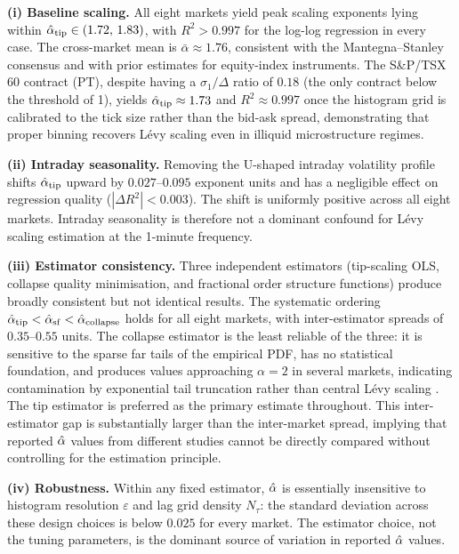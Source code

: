 \documentclass[12pt,a4paper]{article}
\begin{document}
\begin{table}[htbp]
\textbf{(i) Baseline scaling.}
All eight markets yield peak scaling exponents lying within
$\hat{\alpha}_{\mathrm{tip}}\in(1.72,\,1.83)$, with $R^2>0.997$ for the log-log
regression in every case.
The cross-market mean is $\bar\alpha\approx 1.76$, consistent with the
Mantegna--Stanley consensus and with prior estimates for equity-index
instruments.
The S\&P/TSX 60 contract (PT), despite having a $\sigma_1/\Delta$ ratio of
$0.18$ (the only contract below the threshold of 1), yields
$\hat{\alpha}_{\mathrm{tip}}\approx 1.73$ and $R^2\approx 0.997$ once the
histogram grid is calibrated to the tick size rather than the bid-ask spread,
demonstrating that proper binning recovers Lévy scaling even in illiquid
microstructure regimes.

\textbf{(ii) Intraday seasonality.}
Removing the U-shaped intraday volatility profile shifts $\hat{\alpha}_{\mathrm{tip}}$
upward by $0.027$--$0.095$ exponent units and has a negligible effect on
regression quality ($|\Delta R^2|<0.003$).
The shift is uniformly positive across all eight markets.
Intraday seasonality is therefore not a dominant confound for Lévy scaling
estimation at the 1-minute frequency.

\textbf{(iii) Estimator consistency.}
Three independent estimators (tip-scaling OLS, collapse quality minimisation,
and fractional order structure functions) produce broadly consistent but
not identical results.
The systematic ordering $\hat{\alpha}_{\mathrm{tip}}<\hat{\alpha}_{\mathrm{sf}}<
\hat{\alpha}_{\mathrm{collapse}}$ holds for all eight markets, with
inter-estimator spreads of $0.35$--$0.55$ units.
The collapse estimator is the least reliable of the three: it is sensitive
to the sparse far tails of the empirical PDF, has no statistical foundation,
and produces values approaching $\alpha=2$ in several markets, indicating
contamination by exponential tail truncation rather than central Lévy scaling
\cite{Weron2001}.
The tip estimator is preferred as the primary estimate throughout.
This inter-estimator gap is substantially larger than the inter-market
spread, implying that reported $\hat{\alpha}$ values from different studies cannot
be directly compared without controlling for the estimation principle.

\textbf{(iv) Robustness.}
Within any fixed estimator, $\hat{\alpha}$ is essentially insensitive to histogram
resolution $\varepsilon$ and lag grid density $N_\tau$: the standard deviation
across these design choices is below $0.025$ for every market.
The estimator choice, not the tuning parameters, is the dominant source of
variation in reported $\hat{\alpha}$ values.


\end{table}
\end{document}
